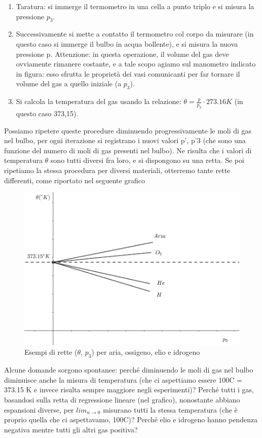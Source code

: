 \documentclass[10pt,a4paper]{article}
\begin{document}
\begin{enumerate}
	\item Taratura: si immerge il termometro in una cella a punto triplo e si misura la pressione $p_3$.
	\item Successivamente si mette a contatto il termometro col corpo da misurare (in questo caso si immerge il bulbo in acqua bollente), e si misura la nuova pressione p. Attenzione: in questa operazione, il volume del gas deve ovviamente rimanere costante, e a tale scopo agiamo sul manometro indicato in figura: esso sfrutta le proprietà dei vasi comunicanti per far tornare il volume del gas a quello iniziale (a $p_3$).
	\item Si calcola la temperatura del gas usando la relazione: $\theta = \frac{p}{p_3} \cdot 273.16 K$ (in questo caso 373,15).
\end{enumerate}
Possiamo ripetere queste procedure diminuendo progressivamente le moli di gas nel bulbo, per ogni iterazione si registrano i nuovi valori p’, p’3 (che sono una funzione del numero di moli di gas presenti nel bulbo). Ne risulta che i valori di temperatura $\theta$ sono tutti diversi fra loro, e si dispongono su una retta. Se poi ripetiamo la stessa procedura per diversi materiali, otterremo tante rette differenti, come riportato nel seguente grafico
\begin{figure}[h!]
	\centering
	\includegraphics[width=0.7\linewidth]{temp_e_puntotriplo}
	\caption{Esempi di rette ($\theta$, $p_3$) per aria, ossigeno, elio e idrogeno}
	\label{fig:tempepuntotriplo}
\end{figure}
\FloatBarrier
Alcune domande sorgono spontanee: perché diminuendo le moli di gas nel bulbo diminuisce anche la misura di temperatura (che ci aspettiamo essere 100\textdegree C = 373.15 \textdegree K e invece risulta sempre maggiore negli esperimenti)? Perché tutti i gas, basandosi sulla retta di regressione lineare (nel grafico), nonostante abbiano espansioni diverse, per $lim_{n \to 0}$ misurano tutti la stessa temperatura (che è proprio quella che ci aspettavamo, 100\textdegree C)? Perché elio e idrogeno hanno pendenza negativa mentre tutti gli altri gas positiva?\\
\end{document}
